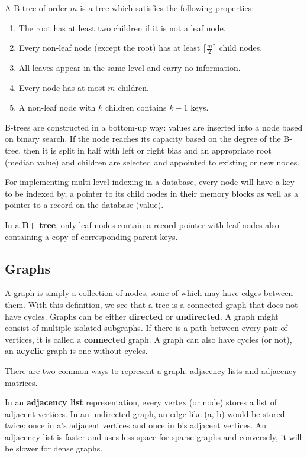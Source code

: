 \documentclass{article}
\begin{document}
    A B-tree of order $m$ is a tree which satisfies the following properties:
    \begin{enumerate}
        \item The root has at least two children if it is not a leaf node.
        \item Every non-leaf node (except the root) has at least $ \lceil \frac{m}{2} \rceil$ child nodes.
        \item All leaves appear in the same level and carry no information.
        \item Every node has at most $m$ children.
        \item A non-leaf node with $k$ children contains $k-1$ keys.
    \end{enumerate}
    
    
    B-trees are constructed in a bottom-up way: values are inserted into a node based on binary search. If the node reaches its capacity based on the degree of the B-tree, then it is split in half with left or right bias and an appropriate root (median value) and children are selected and appointed to existing or new nodes.
    
    For implementing multi-level indexing in a database, every node will have a key to be indexed by, a pointer to its child nodes in their memory blocks as well as a pointer to a record on the database (value).
    
    In a \textbf{B+ tree}, only leaf nodes contain a record pointer with leaf nodes also containing a copy of corresponding parent keys.
    
    \subsection{Graphs}
    A graph is simply a collection of nodes, some of which may have edges between them. With this definition, we see that a tree is a connected graph that does not have cycles. Graphs can be either \textbf{directed} or \textbf{undirected}. A graph might consist of multiple isolated subgraphs. If there is a path between every pair of vertices, it is called a \textbf{connected} graph. A graph can also have cycles (or not), an \textbf{acyclic} graph is one without cycles. 
    
    There are two common ways to represent a graph: adjacency lists and adjacency matrices. 
    
    In an \textbf{adjacency list} representation, every vertex (or node) stores a list of adjacent vertices. In an undirected graph, an edge like (a, b) would be stored twice: once in a's adjacent vertices and once in b's adjacent vertices. An adjacency list is faster and uses less space for sparse graphs and conversely, it will be slower for dense graphs.
    
\end{document}
